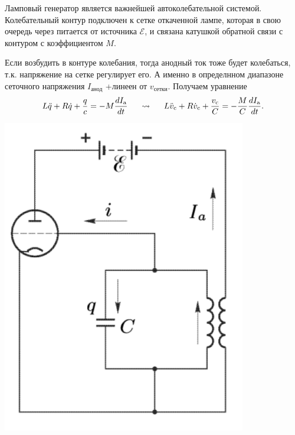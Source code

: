 \noindent
\begin{minipage}{0.70\linewidth}
\phantom{123} 
	Ламповый генератор является важнейшей автоколебательной системой. Колебательный контур подключен к сетке откаченной лампе, которая в свою очередь через питается от источника $\mathscr{E}$, и связана катушкой обратной связи с контуром с коэффициентом $M$.

\phantom{123} 
	Если возбудить в контуре колебания, тогда анодный ток тоже будет колебаться, т.к. напряжение на сетке регулирует его.
	А именно в определнном диапазоне сеточного напряжения $I_\text{анод} $ +линеен от $v_\text{сетки} $.
	Получаем уравнение 
\begin{equation}
	 L \ddot{q} +R \dot{q} + \frac{q}{c} = - M \frac{d I_\text{a}}{d t}
	 \hspace*{0.5 cm} \leadsto \hspace*{0.5 cm} L \ddot{v}_\text{c} +R \dot{v}_\text{c}+ \frac{v_\text{c}}{C} = - \frac{M}{C} \frac{d I_\text{a}}{d t}.
\end{equation}
\end{minipage}
\hfill
\begin{minipage}{0.25\linewidth}
	\centering
	\includegraphics[width=0.8\textwidth]{img/lamp.png}
\end{minipage}

